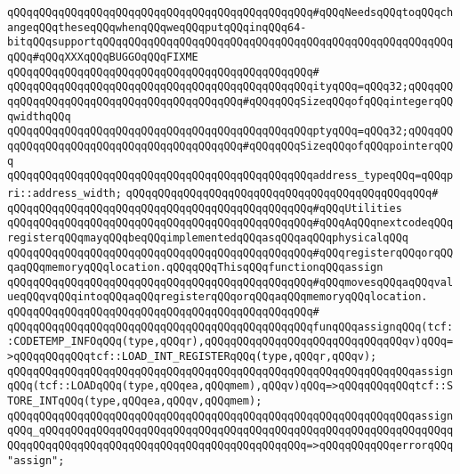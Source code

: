 \newline
\verb|qQQqqQQqqQQqqQQqqQQqqQQqqQQqqQQqqQQqqQQqqQQqqQQq#qQQqNeedsqQQqtoqQQqchangeqQQqtheseqQQqwhenqQQqweqQQqputqQQqinqQQq64-bitqQQqsupportqQQqqQQqqQQqqQQqqQQqqQQqqQQqqQQqqQQqqQQqqQQqqQQqqQQqqQQqqQQq#qQQqXXXqQQqBUGGOqQQqFIXME|\newline
\verb|qQQqqQQqqQQqqQQqqQQqqQQqqQQqqQQqqQQqqQQqqQQqqQQq#|\newline
\verb|qQQqqQQqqQQqqQQqqQQqqQQqqQQqqQQqqQQqqQQqqQQqqQQqityqQQq=qQQq32;qQQqqQQqqQQqqQQqqQQqqQQqqQQqqQQqqQQqqQQqqQQq#qQQqqQQqSizeqQQqofqQQqintegerqQQqwidthqQQq|\newline
\verb|qQQqqQQqqQQqqQQqqQQqqQQqqQQqqQQqqQQqqQQqqQQqqQQqptyqQQq=qQQq32;qQQqqQQqqQQqqQQqqQQqqQQqqQQqqQQqqQQqqQQqqQQq#qQQqqQQqSizeqQQqofqQQqpointerqQQq|\newline
\newline
\verb|qQQqqQQqqQQqqQQqqQQqqQQqqQQqqQQqqQQqqQQqqQQqqQQqaddress_typeqQQq=qQQqpri::address_width;|\newline
\newline
\verb|qQQqqQQqqQQqqQQqqQQqqQQqqQQqqQQqqQQqqQQqqQQqqQQq#|\newline
\verb|qQQqqQQqqQQqqQQqqQQqqQQqqQQqqQQqqQQqqQQqqQQqqQQq#qQQqUtilities|\newline
\newline
\newline
\verb|qQQqqQQqqQQqqQQqqQQqqQQqqQQqqQQqqQQqqQQqqQQqqQQq#qQQqAqQQqnextcodeqQQqregisterqQQqmayqQQqbeqQQqimplementedqQQqasqQQqaqQQqphysicalqQQq|\newline
\verb|qQQqqQQqqQQqqQQqqQQqqQQqqQQqqQQqqQQqqQQqqQQqqQQq#qQQqregisterqQQqorqQQqaqQQqmemoryqQQqlocation.qQQqqQQqThisqQQqfunctionqQQqassign|\newline
\verb|qQQqqQQqqQQqqQQqqQQqqQQqqQQqqQQqqQQqqQQqqQQqqQQq#qQQqmovesqQQqaqQQqvalueqQQqvqQQqintoqQQqaqQQqregisterqQQqorqQQqaqQQqmemoryqQQqlocation.|\newline
\verb|qQQqqQQqqQQqqQQqqQQqqQQqqQQqqQQqqQQqqQQqqQQqqQQq#|\newline
\verb|qQQqqQQqqQQqqQQqqQQqqQQqqQQqqQQqqQQqqQQqqQQqqQQqfunqQQqassignqQQq(tcf::CODETEMP_INFOqQQq(type,qQQqr),qQQqqQQqqQQqqQQqqQQqqQQqqQQqqQQqv)qQQq=>qQQqqQQqqQQqtcf::LOAD_INT_REGISTERqQQq(type,qQQqr,qQQqv);|\newline
\verb|qQQqqQQqqQQqqQQqqQQqqQQqqQQqqQQqqQQqqQQqqQQqqQQqqQQqqQQqqQQqqQQqassignqQQq(tcf::LOADqQQq(type,qQQqea,qQQqmem),qQQqv)qQQq=>qQQqqQQqqQQqtcf::STORE_INTqQQq(type,qQQqea,qQQqv,qQQqmem);|\newline
\verb|qQQqqQQqqQQqqQQqqQQqqQQqqQQqqQQqqQQqqQQqqQQqqQQqqQQqqQQqqQQqqQQqassignqQQq_qQQqqQQqqQQqqQQqqQQqqQQqqQQqqQQqqQQqqQQqqQQqqQQqqQQqqQQqqQQqqQQqqQQqqQQqqQQqqQQqqQQqqQQqqQQqqQQqqQQqqQQqqQQqqQQq=>qQQqqQQqqQQqerrorqQQq"assign";|\newline
